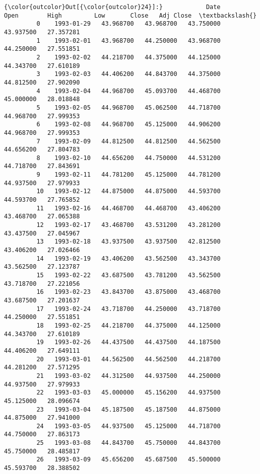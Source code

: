 \documentclass[11pt]{article}
\begin{document}
\begin{Verbatim}[commandchars=\\\{\}]
{\color{outcolor}Out[{\color{outcolor}24}]:}            Date        Open        High         Low       Close   Adj Close  \textbackslash{}
         0    1993-01-29   43.968700   43.968700   43.750000   43.937500   27.357281   
         1    1993-02-01   43.968700   44.250000   43.968700   44.250000   27.551851   
         2    1993-02-02   44.218700   44.375000   44.125000   44.343700   27.610189   
         3    1993-02-03   44.406200   44.843700   44.375000   44.812500   27.902090   
         4    1993-02-04   44.968700   45.093700   44.468700   45.000000   28.018848   
         5    1993-02-05   44.968700   45.062500   44.718700   44.968700   27.999353   
         6    1993-02-08   44.968700   45.125000   44.906200   44.968700   27.999353   
         7    1993-02-09   44.812500   44.812500   44.562500   44.656200   27.804783   
         8    1993-02-10   44.656200   44.750000   44.531200   44.718700   27.843691   
         9    1993-02-11   44.781200   45.125000   44.781200   44.937500   27.979933   
         10   1993-02-12   44.875000   44.875000   44.593700   44.593700   27.765852   
         11   1993-02-16   44.468700   44.468700   43.406200   43.468700   27.065388   
         12   1993-02-17   43.468700   43.531200   43.281200   43.437500   27.045967   
         13   1993-02-18   43.937500   43.937500   42.812500   43.406200   27.026466   
         14   1993-02-19   43.406200   43.562500   43.343700   43.562500   27.123787   
         15   1993-02-22   43.687500   43.781200   43.562500   43.718700   27.221056   
         16   1993-02-23   43.843700   43.875000   43.468700   43.687500   27.201637   
         17   1993-02-24   43.718700   44.250000   43.718700   44.250000   27.551851   
         18   1993-02-25   44.218700   44.375000   44.125000   44.343700   27.610189   
         19   1993-02-26   44.437500   44.437500   44.187500   44.406200   27.649111   
         20   1993-03-01   44.562500   44.562500   44.218700   44.281200   27.571295   
         21   1993-03-02   44.312500   44.937500   44.250000   44.937500   27.979933   
         22   1993-03-03   45.000000   45.156200   44.937500   45.125000   28.096674   
         23   1993-03-04   45.187500   45.187500   44.875000   44.875000   27.941000   
         24   1993-03-05   44.937500   45.125000   44.718700   44.750000   27.863173   
         25   1993-03-08   44.843700   45.750000   44.843700   45.750000   28.485817   
         26   1993-03-09   45.656200   45.687500   45.500000   45.593700   28.388502   

\end{Verbatim}
\end{document}
